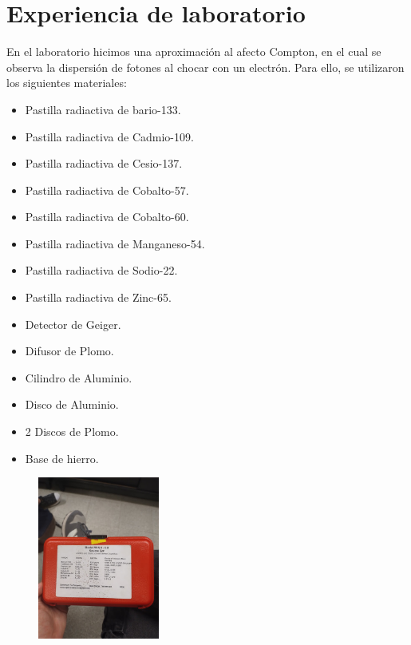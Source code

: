 \documentclass[a4paper]{article}
\begin{document}
    \saltoPag

    \section{Experiencia de laboratorio}

    \indent En el laboratorio hicimos una aproximación al afecto Compton, en el cual se observa la dispersión de fotones al chocar con un electrón. Para ello, se utilizaron los siguientes materiales:

    \begin{itemize}
        \item Pastilla radiactiva de bario-133.
        \item Pastilla radiactiva de Cadmio-109.
        \item Pastilla radiactiva de Cesio-137.
        \item Pastilla radiactiva de Cobalto-57.
        \item Pastilla radiactiva de Cobalto-60.
        \item Pastilla radiactiva de Manganeso-54.
        \item Pastilla radiactiva de Sodio-22.
        \item Pastilla radiactiva de Zinc-65.
        \item Detector de Geiger.
        \item Difusor de Plomo.
        \item Cilindro de Aluminio.
        \item Disco de Aluminio.
        \item 2 Discos de Plomo.
        \item Base de hierro.
    \end{itemize}

    \begin{figure}[h!]
        \centering
        \includegraphics[width=4cm]{../imagenes/pastillasrad.jpg}
    \end{figure}
\end{document}
